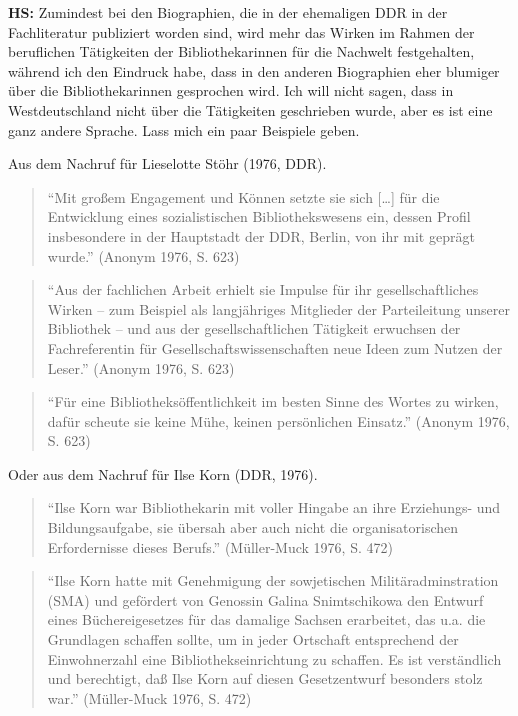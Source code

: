 \documentclass[a4paper,
fontsize=11pt,
oneside,
numbers=noperiodatend,
parskip=half-,
bibliography=totoc,
final
]{scrartcl}
\begin{document}
\textbf{HS:} Zumindest bei den Biographien, die in der ehemaligen DDR in
der Fachliteratur publiziert worden sind, wird mehr das Wirken im Rahmen
der beruflichen Tätigkeiten der Bibliothekarinnen für die Nachwelt
festgehalten, während ich den Eindruck habe, dass in den anderen
Biographien eher blumiger über die Bibliothekarinnen gesprochen wird.
Ich will nicht sagen, dass in Westdeutschland nicht über die Tätigkeiten
geschrieben wurde, aber es ist eine ganz andere Sprache. Lass mich ein
paar Beispiele geben.

Aus dem Nachruf für Lieselotte Stöhr (1976, DDR).

\begin{quote}
\enquote{Mit großem Engagement und Können setzte sie sich {[}\ldots{}{]}
für die Entwicklung eines sozialistischen Bibliothekswesens ein, dessen
Profil insbesondere in der Hauptstadt der DDR, Berlin, von ihr mit
geprägt wurde.} (Anonym 1976, S. 623)
\end{quote}

\begin{quote}
\enquote{Aus der fachlichen Arbeit erhielt sie Impulse für ihr
gesellschaftliches Wirken -- zum Beispiel als langjähriges Mitglieder
der Parteileitung unserer Bibliothek -- und aus der gesellschaftlichen
Tätigkeit erwuchsen der Fachreferentin für Gesellschaftswissenschaften
neue Ideen zum Nutzen der Leser.} (Anonym 1976, S. 623)
\end{quote}

\begin{quote}
\enquote{Für eine Bibliotheksöffentlichkeit im besten Sinne des Wortes
zu wirken, dafür scheute sie keine Mühe, keinen persönlichen Einsatz.}
(Anonym 1976, S. 623)
\end{quote}

Oder aus dem Nachruf für Ilse Korn (DDR, 1976).

\begin{quote}
\enquote{Ilse Korn war Bibliothekarin mit voller Hingabe an ihre
Erziehungs- und Bildungsaufgabe, sie übersah aber auch nicht die
organisatorischen Erfordernisse dieses Berufs.} (Müller-Muck 1976, S.
472)
\end{quote}

\begin{quote}
\enquote{Ilse Korn hatte mit Genehmigung der sowjetischen
Militäradminstration (SMA) und gefördert von Genossin Galina
Snimtschikowa den Entwurf eines Büchereigesetzes für das damalige
Sachsen erarbeitet, das u.a. die Grundlagen schaffen sollte, um in jeder
Ortschaft entsprechend der Einwohnerzahl eine Bibliothekseinrichtung zu
schaffen. Es ist verständlich und berechtigt, daß Ilse Korn auf diesen
Gesetzentwurf besonders stolz war.} (Müller-Muck 1976, S. 472)
\end{quote}
\end{document}
